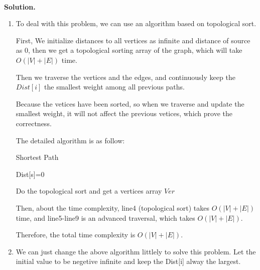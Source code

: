 \documentclass[12pt,a4paper]{article}
\theoremstyle{definition}
\begin{document}
\begin{enumerate}
    ~\\
       \textbf{Solution.}
       \begin{enumerate}
       	\item To deal with this problem, we can use an algorithm based on  topological sort. 
       	
       	First, We initialize distances to all vertices as infinite and distance of source as 0, then we get a topological sorting array of the graph, which will take $O(|V|+|E|)$ time. 
       	
       Then we traverse the vertices and the edges, and continuously keep the $Dist[i]$ the smallest weight among all previous paths.
       
       Because the vetices have been sorted, so when we traverse and update the smallest weight, it will not affect the previous vetices, which prove the correctness.
       	
       	The detailed algorithm is as follow:
       	
       	\begin{minipage}[t]{0.8\textwidth}
       		\begin{algorithm}[H]
       			
       			\BlankLine
       			\caption{Shortest Path}\label{Alg_Quick}
       			
       			
       			Dist[s]=0\;
       			
       			Do the topological sort and get a vertices array $Ver$ \;
       			
       			
       			
       		\end{algorithm}
       	\end{minipage}
       	
       	Then, about the time complexity, line4 (topological sort) takes $O(|V|+|E|)$ time, and line5-line9 is an advanced traversal, which takes $O(|V|+|E|)$. 
       	
       	Therefore, the total time complexity is $O(|V|+|E|)$.
       	
       	
       	\item We can just change the above algorithm littlely to solve this problem. Let  the initial value to be negetive infinite and keep the Dist[i] alway the largest.
       	

\end{enumerate}
\end{enumerate}
\end{document}
